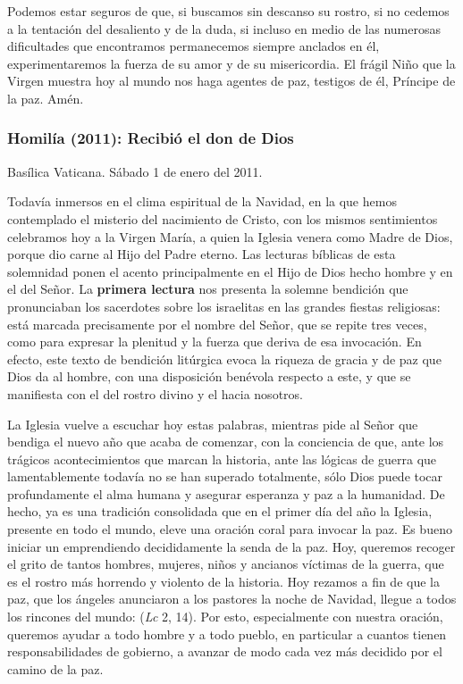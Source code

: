 \begin{body}
\begin{body}
{Podemos estar seguros de que, si buscamos sin descanso su rostro, si no cedemos a la tentación del desaliento y de la duda, si incluso en medio de las numerosas dificultades que encontramos permanecemos siempre anclados en él, experimentaremos la fuerza de su amor y de su misericordia. El frágil Niño que la Virgen muestra hoy al mundo nos haga agentes de paz, testigos de él, Príncipe de la paz. Amén.

\subsubsection{Homilía (2011): Recibió el don de Dios}

Basílica Vaticana. Sábado 1 de enero del 2011.

Todavía inmersos en el clima espiritual de la Navidad, en la que hemos contemplado el misterio del nacimiento de Cristo, con los mismos sentimientos celebramos hoy a la Virgen María, a quien la Iglesia venera como Madre de Dios, porque dio carne al Hijo del Padre eterno. Las lecturas bíblicas de esta solemnidad ponen el acento principalmente en el Hijo de Dios hecho hombre y en el  del Señor. La \textbf{primera lectura} nos presenta la solemne bendición que pronunciaban los sacerdotes sobre los israelitas en las grandes fiestas religiosas: está marcada precisamente por el nombre del Señor, que se repite tres veces, como para expresar la plenitud y la fuerza que deriva de esa invocación. En efecto, este texto de bendición litúrgica evoca la riqueza de gracia y de paz que Dios da al hombre, con una disposición benévola respecto a este, y que se manifiesta con el  del rostro divino y el  hacia nosotros.

La Iglesia vuelve a escuchar hoy estas palabras, mientras pide al Señor que bendiga el nuevo año que acaba de comenzar, con la conciencia de que, ante los trágicos acontecimientos que marcan la historia, ante las lógicas de guerra que lamentablemente todavía no se han superado totalmente, sólo Dios puede tocar profundamente el alma humana y asegurar esperanza y paz a la humanidad. De hecho, ya es una tradición consolidada que en el primer día del año la Iglesia, presente en todo el mundo, eleve una oración coral para invocar la paz. Es bueno iniciar un emprendiendo decididamente la senda de la paz. Hoy, queremos recoger el grito de tantos hombres, mujeres, niños y ancianos víctimas de la guerra, que es el rostro más horrendo y violento de la historia. Hoy rezamos a fin de que la paz, que los ángeles anunciaron a los pastores la noche de Navidad, llegue a todos los rincones del mundo:  (\emph{Lc} 2, 14). Por esto, especialmente con nuestra oración, queremos ayudar a todo hombre y a todo pueblo, en particular a cuantos tienen responsabilidades de gobierno, a avanzar de modo cada vez más decidido por el camino de la paz.

}
\end{body}
\end{body}

